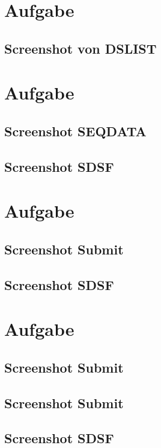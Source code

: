 \documentclass[a4paper]{scrartcl}
\begin{document}
	\section{Aufgabe}
	\subsection{Screenshot von DSLIST}
	\section{Aufgabe}
	\subsection{Screenshot SEQDATA}
	
	\subsection{Screenshot SDSF}
	
	
	
	\section{Aufgabe}
	\subsection{Screenshot Submit}
	
	\subsection{Screenshot SDSF}
	
	
	\section{Aufgabe}
	\subsection{Screenshot Submit}
	
	\subsection{Screenshot Submit}
	
	\subsection{Screenshot SDSF}
	
\end{document}
